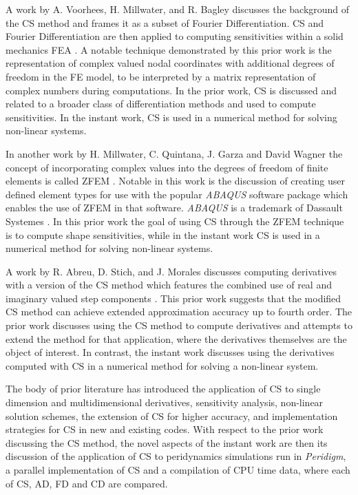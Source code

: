 \documentclass[preprint,12pt]{elsarticle}
\begin{document}
A work by A. Voorhees, H. Millwater, and R. Bagley discusses the background of
the CS method and frames it as a subset of Fourier Differentiation. CS and
Fourier Differentiation are then applied to computing sensitivities within a
solid mechanics FEA \cite{voorhees2011complex}. A notable technique
demonstrated by this prior work is the representation of complex valued nodal
coordinates with additional degrees of freedom in the FE model, to be
interpreted by a matrix representation of complex numbers during computations.
In the prior work, CS is discussed and related to a broader class of
differentiation methods and used to compute sensitivities. In the instant work,
CS is used in a numerical method for solving non-linear systems.

In another work by H. Millwater, C. Quintana, J. Garza and David Wagner the
concept of incorporating complex values into the degrees of freedom of finite
elements is called ZFEM \cite{millwater2013application}. Notable in this work
is the discussion of creating user defined element types for use with the
popular \emph{ABAQUS} software package which enables the use of ZFEM in that
software. \emph{ABAQUS} is a trademark of Dassault Systemes
\cite{systemes2012abaqus}. In this prior work the goal of using CS through the
ZFEM technique is to compute shape sensitivities, while in the instant work CS
is used in a numerical method for solving non-linear systems.

A work by R. Abreu, D. Stich, and J. Morales discusses computing derivatives
with a version of the CS method which features the combined use
of real and imaginary valued step components \cite{abreu2013generalization}.
This prior work suggests that the modified CS method can achieve extended
approximation accuracy up to fourth order.  The prior work discusses using the
CS method to compute derivatives and attempts to extend the method for that
application, where the derivatives themselves are the object of interest. In
contrast, the instant work discusses using the derivatives computed with CS in
a numerical method for solving a non-linear system.

The body of prior literature has introduced the application of CS to
single dimension and multidimensional derivatives, sensitivity analysis,
non-linear solution schemes, the extension of CS for higher accuracy, 
and implementation strategies for CS in new and existing codes.
With respect to the prior work discussing the CS method, the novel
aspects of the instant work are then its discussion of the application of CS to
peridynamics simulations run in \emph{Peridigm}, a parallel implementation of
CS and a compilation of CPU time data, where each of CS, AD, FD and CD are
compared. 
\end{document}

